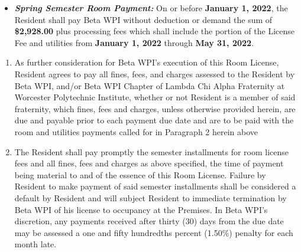 \documentclass[legalpaper, 12pt]{article}
\begin{document}
\begin{enumerate}
\begin{itemize}
                        \item \textbf{\textit{Spring Semester Room Payment:}}
                                On or before \textbf{January 1, 2022}, the
                                Resident shall pay Beta WPI without deduction
                                or demand the sum of \textbf{\$2,928.00} plus
                                processing fees which shall include the portion
                                of the License Fee and utilities from
                                \textbf{January 1, 2022} through \textbf{May
                                31, 2022}.

        \end{itemize}

        \begin{enumerate}[label=\Alph*.] 

                \item As further consideration for Beta WPI’s execution of this
                        Room License, Resident agrees to pay all fines, fees,
                        and charges assessed to the Resident by Beta WPI, and/or
                        Beta WPI Chapter of Lambda Chi Alpha Fraternity at
                        Worcester Polytechnic Institute, whether or not Resident
                        is a member of said fraternity, which fines, fees and
                        charges, unless otherwise provided herein, are due and
                        payable prior to each payment due date and are to be
                        paid with the room and utilities payments called for in
                        Paragraph 2 herein above 

                \item The Resident shall pay promptly the semester installments
                        for room license fees and all fines, fees and charges as
                        above specified, the time of payment being material to
                        and of the essence of this Room License.  Failure by
                        Resident to make payment of said semester installments
                        shall be considered a default by Resident and will
                        subject Resident to immediate termination by Beta WPI of
                        his license to occupancy at the Premises.  In Beta WPI’s
                        discretion, any payments received after thirty (30) days
                        from the due date may be assessed a one and fifty
                        hundredths percent (1.50\%) penalty for each month late. 


\end{enumerate}
\end{enumerate}
\end{document}
